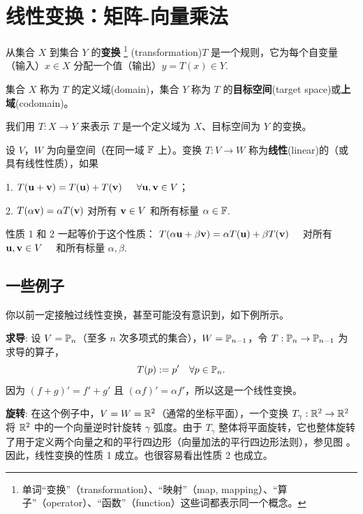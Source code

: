 \section{线性变换：矩阵-向量乘法}\label{sec:01-03}


从集合 $X$ 到集合 $Y$ 的\textbf{变换}
\footnote{
单词“变换”（transformation）、“映射”（map, mapping）、“算子”（operator）、“函数”（function）这些词都表示同一个概念。
} (transformation)$T$ 是一个规则，它为每个自变量（输入）$x \in X$ 分配一个值（输出）$y = T(x) \in Y$.~

集合 $X$ 称为 $T$ 的{\heiti 定义域}(domain)，集合 $Y$ 称为 $T$ 的\textbf{目标空间}(target space)或\textbf{上域}(codomain)。

我们用 $T: X \to Y$ 来表示 $T$ 是一个定义域为 $X$、目标空间为 $Y$ 的变换。

\begin{definition*}
设 $V$，$W$ 为向量空间（在同一域 $\mathbb{F}$ 上）。变换 $T: V \to W$ 称为\textbf{线性}(linear)的（或具有线性性质），如果
\end{definition*}

1. $T(\mathbf{u} + \mathbf{v}) = T(\mathbf{u}) + T(\mathbf{v})$ $\quad \forall \mathbf{u}, \mathbf{v} \in V$；

2. $T(\alpha \mathbf{v}) = \alpha T(\mathbf{v})$ 对所有 $\mathbf{v} \in V$ 和所有标量 $\alpha \in \mathbb{F}$.


性质 1 和 2 一起等价于这个性质：
$T(\alpha \mathbf{u} + \beta \mathbf{v}) = \alpha T(\mathbf{u}) + \beta T(\mathbf{v})$ ~~对所有 $\mathbf{u}, \mathbf{v} \in V$ ~~和所有标量 $\alpha, \beta$.~



\subsection{一些例子}\label{sec:01-03-01}
你以前一定接触过线性变换，甚至可能没有意识到，如下例所示。

\begin{example*}
\textbf{求导}: 设 $V = \mathbb{P}_n$（至多 $n$ 次多项式的集合），$W = \mathbb{P}_{n-1}$，令 $T : \mathbb{P}_n \to \mathbb{P}_{n-1}$ 为求导的算子，
$$ T(p) := p' \quad \forall p \in \mathbb{P}_n. $$
因为 $(f+g)' = f' + g'$ 且 $(\alpha f)' = \alpha f'$，所以这是一个线性变换。
\end{example*}


\begin{example*}
\textbf{旋转}: 在这个例子中，$V = W = \mathbb{R}^2$（通常的坐标平面），一个变换 $T_\gamma : \mathbb{R}^2 \to \mathbb{R}^2$ 将 $\mathbb{R}^2$ 中的一个向量逆时针旋转 $\gamma$ 弧度。由于 $T_\gamma$ 整体将平面旋转，它也整体旋转了用于定义两个向量之和的平行四边形（向量加法的平行四边形法则），参见图 。因此，线性变换的性质 1 成立。也很容易看出性质 2 也成立。
\end{example*}


